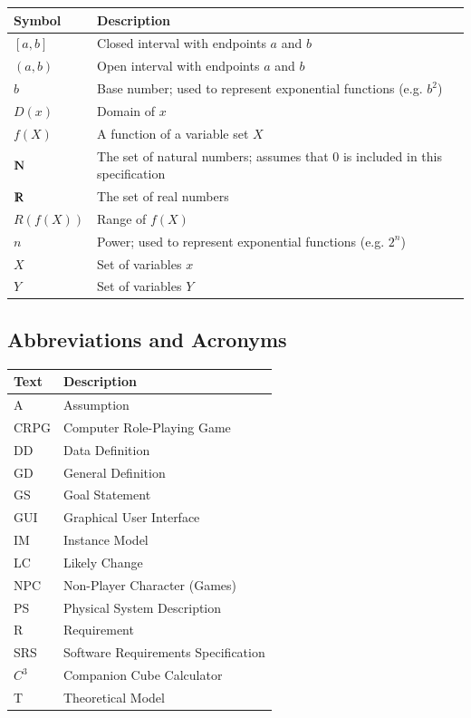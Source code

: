 \documentclass[12pt]{article}
\newcommand{\progname}{Companion Cube Calculator} %
\newcommand{\prognameAbbrv}{$C^{3}$}
\begin{document}
\renewcommand{\arraystretch}{1.2}
\noindent \begin{longtable*}{m{1.5cm} m{12cm}} \toprule
\textbf{Symbol}  & \textbf{Description}\\
\midrule 
$[a,b]$ & Closed interval with endpoints $a$ and $b$\\
$(a,b)$ & Open interval with endpoints $a$ and $b$\\
$b$  & Base number; used to represent exponential functions (e.g. $b^2$)\\
$D(x)$  & Domain of $x$\\
$f(X)$  & A function of a variable set $X$\\
$\varmathbb{N}$  & The set of natural numbers; assumes that $0$ is included 
in this specification\\
$\varmathbb{R}$  & The set of real numbers\\
$R(f(X))$  & Range of $f(X)$\\
$n$  & Power; used to represent exponential functions (e.g. $2^n$) \\
$X$ & Set of variables $x$\\
$Y$ & Set of variables $Y$\\
\bottomrule
\end{longtable*}

\subsection{Abbreviations and Acronyms}

\renewcommand{\arraystretch}{1.2}
\begin{tabular}{l l} 
  \toprule		
  \textbf{Text} & \textbf{Description}\\
  \midrule 
  A & Assumption\\
  CRPG & Computer Role-Playing Game\\
  DD & Data Definition\\
  GD & General Definition\\
  GS & Goal Statement\\
  GUI & Graphical User Interface\\
  IM & Instance Model\\
  LC & Likely Change\\
  NPC & Non-Player Character (Games)\\
  PS & Physical System Description\\
  R & Requirement\\
  SRS & Software Requirements Specification\\
  \prognameAbbrv{} & \progname{}\\
  T & Theoretical Model\\
  \bottomrule
\end{tabular}
\end{document}
